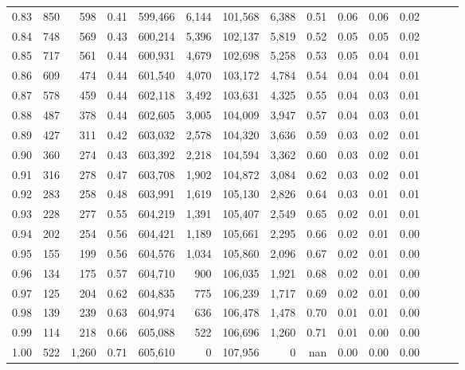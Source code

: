 \begin{tabular}{rrrrrrrrrrrrrrr}
0.83 &     850 &    598 &  0.41 &  599,466 &    6,144 &  101,568 &    6,388 &  0.51 &  0.06 &  0.06 &      0.02 \\
0.84 &     748 &    569 &  0.43 &  600,214 &    5,396 &  102,137 &    5,819 &  0.52 &  0.05 &  0.05 &      0.02 \\
0.85 &     717 &    561 &  0.44 &  600,931 &    4,679 &  102,698 &    5,258 &  0.53 &  0.05 &  0.04 &      0.01 \\
0.86 &     609 &    474 &  0.44 &  601,540 &    4,070 &  103,172 &    4,784 &  0.54 &  0.04 &  0.04 &      0.01 \\
0.87 &     578 &    459 &  0.44 &  602,118 &    3,492 &  103,631 &    4,325 &  0.55 &  0.04 &  0.03 &      0.01 \\
0.88 &     487 &    378 &  0.44 &  602,605 &    3,005 &  104,009 &    3,947 &  0.57 &  0.04 &  0.03 &      0.01 \\
0.89 &     427 &    311 &  0.42 &  603,032 &    2,578 &  104,320 &    3,636 &  0.59 &  0.03 &  0.02 &      0.01 \\
0.90 &     360 &    274 &  0.43 &  603,392 &    2,218 &  104,594 &    3,362 &  0.60 &  0.03 &  0.02 &      0.01 \\
0.91 &     316 &    278 &  0.47 &  603,708 &    1,902 &  104,872 &    3,084 &  0.62 &  0.03 &  0.02 &      0.01 \\
0.92 &     283 &    258 &  0.48 &  603,991 &    1,619 &  105,130 &    2,826 &  0.64 &  0.03 &  0.01 &      0.01 \\
0.93 &     228 &    277 &  0.55 &  604,219 &    1,391 &  105,407 &    2,549 &  0.65 &  0.02 &  0.01 &      0.01 \\
0.94 &     202 &    254 &  0.56 &  604,421 &    1,189 &  105,661 &    2,295 &  0.66 &  0.02 &  0.01 &      0.00 \\
0.95 &     155 &    199 &  0.56 &  604,576 &    1,034 &  105,860 &    2,096 &  0.67 &  0.02 &  0.01 &      0.00 \\
0.96 &     134 &    175 &  0.57 &  604,710 &      900 &  106,035 &    1,921 &  0.68 &  0.02 &  0.01 &      0.00 \\
0.97 &     125 &    204 &  0.62 &  604,835 &      775 &  106,239 &    1,717 &  0.69 &  0.02 &  0.01 &      0.00 \\
0.98 &     139 &    239 &  0.63 &  604,974 &      636 &  106,478 &    1,478 &  0.70 &  0.01 &  0.01 &      0.00 \\
0.99 &     114 &    218 &  0.66 &  605,088 &      522 &  106,696 &    1,260 &  0.71 &  0.01 &  0.00 &      0.00 \\
1.00 &     522 &  1,260 &  0.71 &  605,610 &        0 &  107,956 &        0 &   nan &  0.00 &  0.00 &      0.00 \\
\bottomrule
\end{tabular}
